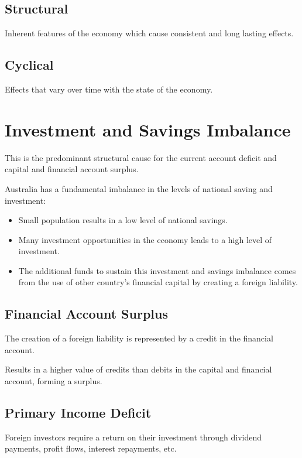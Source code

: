 \documentclass[a4paper,11pt]{article}
\begin{document}
\subsection{Structural}

Inherent features of the economy which cause consistent and long lasting
effects.


\subsection{Cyclical}

Effects that vary over time with the state of the economy.




\section{Investment and Savings Imbalance}

This is the predominant structural cause for the current account deficit and
capital and financial account surplus.

Australia has a fundamental imbalance in the levels of national saving and
investment:

\begin{itemize}
\item Small population results in a low level of national savings.
\item Many investment opportunities in the economy leads to a high level of
	investment.
\item The additional funds to sustain this investment and savings imbalance
	comes from the use of other country's financial capital by creating a
	foreign liability.
\end{itemize}


\subsection{Financial Account Surplus}

The creation of a foreign liability is represented by a credit in the financial
account.

Results in a higher value of credits than debits in the capital and financial
account, forming a surplus.


\subsection{Primary Income Deficit}

Foreign investors require a return on their investment through dividend
payments, profit flows, interest repayments, etc.
\end{document}
